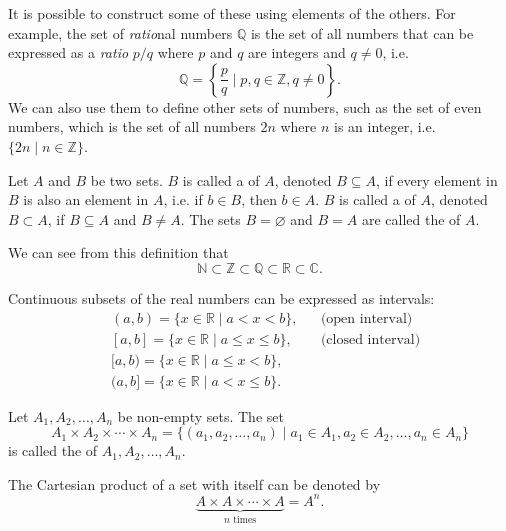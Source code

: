 It is possible to construct some of these using elements of the others. For example, the set of \emph{ratio}nal numbers $ \mathbb{Q} $ is the set of all numbers that can be expressed as a \emph{ratio} $ p/q $ where $ p $ and $ q $ are integers and $ q\neq 0 $, i.e.
\begin{equation*}
    \mathbb{Q}=\left\{\frac{p}{q}\mid p,q\in\mathbb{Z},q\neq 0\right\}.
\end{equation*}
We can also use them to define other sets of numbers, such as the set of even numbers, which is the set of all numbers $ 2n $ where $ n $ is an integer, i.e. $ \{2n\mid n\in\mathbb{Z}\} $.

\begin{defn}
Let $ A $ and $ B $ be two sets. $ B $ is called a  of $ A $, denoted $ B\subseteq A $, if every element in $ B $ is also an element in $ A $, i.e. if $ b\in B $, then $ b\in A $. $ B $ is called a  of $ A $, denoted $ B\subset A $, if $ B\subseteq A $ and $ B\neq A $. The sets $ B=\varnothing $ and $ B=A $ are called the  of $ A $.
\end{defn}

We can see from this definition that
\begin{equation*}
    \mathbb{N}\subset\mathbb{Z}\subset\mathbb{Q}\subset\mathbb{R}\subset\mathbb{C}.
\end{equation*}

Continuous subsets of the real numbers can be expressed as intervals:
\begin{align*}
    & (a,b)=\{x\in\mathbb{R}\mid a<x<b\}, && \text{(open interval)} \\
    & [a,b]=\{x\in\mathbb{R}\mid a\leq x\leq b\}, &&\text{(closed interval)} \\
    & [a,b)=\{x\in\mathbb{R}\mid a\leq x<b \}, \\
    & (a,b]=\{x\in\mathbb{R}\mid a<x\leq b\}.
\end{align*}

\begin{defn}
Let $ A_1,A_2,\ldots,A_n $ be non-empty sets. The set
\begin{equation*}
    A_1\times A_2\times \cdots\times A_n=\{(a_1,a_2,\ldots,a_n)\mid a_1\in A_1,a_2\in A_2,\ldots,a_n\in A_n\}
\end{equation*}
is called the  of $ A_1,A_2,\ldots,A_n $.

The Cartesian product of a set with itself can be denoted by
\begin{equation*}
    \underbrace{A\times A\times\cdots\times A}_{n\text{ times}}=A^n.
\end{equation*}
\end{defn}


